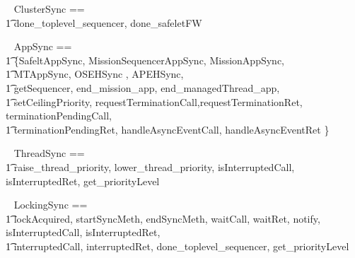 %
\begin{circus}
\circchannelset ~ ClusterSync == \\ \t1 \lchanset done\_toplevel\_sequencer, done\_safeletFW \rchanset
\end{circus}
%
\begin{circus}
\circchannelset ~ AppSync == \\ \t1  \bigcup \{SafeltAppSync, MissionSequencerAppSync, MissionAppSync, \\ \t1 MTAppSync, OSEHSync , APEHSync,  \\ \t1
	\lchanset getSequencer, end\_mission\_app, end\_managedThread\_app, \\ \t1 setCeilingPriority, requestTerminationCall,requestTerminationRet, terminationPendingCall, \\ \t1 terminationPendingRet, handleAsyncEventCall, handleAsyncEventRet \rchanset  \}
\end{circus}
%

\begin{circus}
\circchannelset ~ ThreadSync == \\ \t1  \lchanset raise\_thread\_priority, lower\_thread\_priority, isInterruptedCall, isInterruptedRet, get\_priorityLevel \rchanset
\end{circus}

\begin{circus}
\circchannelset ~ LockingSync == \\ \t1  \lchanset lockAcquired, startSyncMeth, endSyncMeth, waitCall, waitRet, notify, isInterruptedCall, isInterruptedRet, \\
\t1 interruptedCall, interruptedRet, done\_toplevel\_sequencer, get\_priorityLevel  \rchanset
\end{circus}

%
